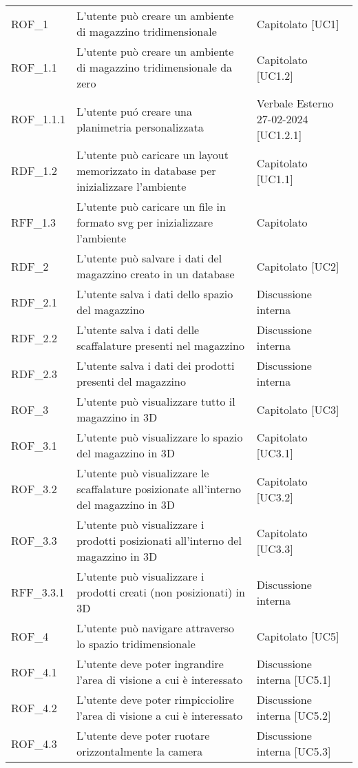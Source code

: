 \begin{xltabular}{\textwidth}{ p{0.2\textwidth} | X | p{0.2\textwidth} }
    ROF\_1& L'utente può creare un ambiente di magazzino tridimensionale & Capitolato [UC1]\\
    ROF\_1.1& L'utente può creare un ambiente di magazzino tridimensionale da zero & Capitolato [UC1.2]\\
    ROF\_1.1.1 & L'utente puó creare una planimetria personalizzata & Verbale Esterno 27-02-2024 [UC1.2.1]\\
    RDF\_1.2& L'utente può caricare un layout memorizzato in database per inizializzare l'ambiente & Capitolato [UC1.1]\\
    RFF\_1.3& L'utente può caricare un file in formato svg per inizializzare l'ambiente & Capitolato \\
    RDF\_2& L'utente può salvare i dati del magazzino creato in un database & Capitolato [UC2]  \\
    RDF\_2.1& L'utente salva i dati dello spazio del magazzino & Discussione interna   \\
    RDF\_2.2& L'utente salva i dati delle scaffalature presenti nel magazzino & Discussione interna   \\
    RDF\_2.3& L'utente salva i dati dei prodotti presenti del magazzino & Discussione interna     \\
    ROF\_3& L'utente può visualizzare tutto il magazzino in 3D & Capitolato [UC3]\\
    ROF\_3.1& L'utente può visualizzare lo spazio del magazzino in 3D & Capitolato [UC3.1]\\
    ROF\_3.2& L'utente può visualizzare le scaffalature posizionate all'interno del magazzino in 3D & Capitolato [UC3.2]\\
    ROF\_3.3& L'utente può visualizzare i prodotti posizionati all'interno del magazzino in 3D & Capitolato [UC3.3]\\
    RFF\_3.3.1& L'utente può visualizzare i prodotti creati (non posizionati) in 3D & Discussione interna       \\
    ROF\_4& L'utente può navigare attraverso lo spazio tridimensionale & Capitolato [UC5]\\
    ROF\_4.1& L'utente deve poter ingrandire l'area di visione a cui è interessato & Discussione interna [UC5.1] \\
    ROF\_4.2& L'utente deve poter rimpicciolire l'area di visione a cui è interessato & Discussione interna [UC5.2] \\
    ROF\_4.3& L'utente deve poter ruotare orizzontalmente la camera & Discussione interna [UC5.3] \\

\end{xltabular}
